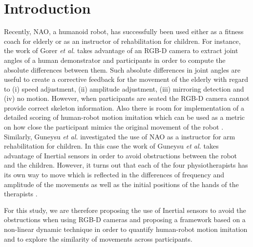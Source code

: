 \documentclass{sig-alternate-05-2015}
\begin{document}
\section{Introduction}
Recently, NAO, a humanoid robot, has successfully been used either as a fitness coach for elderly 
or as an instructor of rehabilitation for children.
For instance, the work of Gorer \textit{et al.} takes advantage of an RGB-D camera to 
extract joint angles of a human demonstrator and participants in order to
compute the absolute differences between them. Such absolute differences
in joint angles are useful to create a corrective feedback for the movement of the elderly 
with regard to (i) speed adjustment, (ii) amplitude adjustment, (iii) mirroring detection
and (iv) no motion.
However, when participants are seated the RGB-D camera cannot provide correct skeleton information.
Also there is room for implementation of a detailed scoring 
of human-robot motion imitation which can be used as a metric on how close the participant mimics the original movement 
of the robot \cite{Gorer2013, Gorer2016}.
Similarly, Guneysu \textit{et al.} investigated the use of NAO
as a instructor for arm rehabilitation for children. 
In this case the work of Guneysu \textit{et al.} takes advantage of 
Inertial sensors in order to avoid obstructions between the robot and the children.
However,  it turns out that
each of the four physiotherapists has its own way to move
which is reflected in the differences of frequency and amplitude of the movements
as well as the initial positions of the hands of the therapists \cite{Guneysu2015}.

For this study, we are therefore proposing the use 
of Inertial sensors to avoid the obstructions when using RGB-D cameras 
\cite{Gorer2013, Gorer2016} and proposing a framework based on a non-linear dynamic technique 
in order to quantify human-robot motion imitation 
and to explore the similarity of movements across participants.



\end{document}
